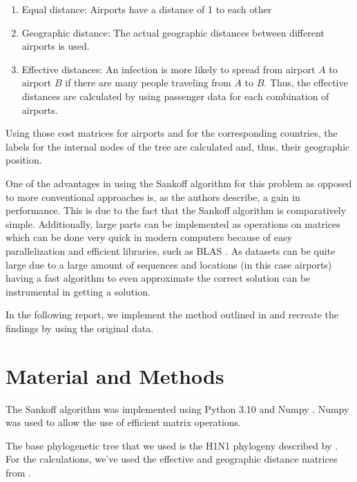 \documentclass{article}
\begin{document}
\begin{enumerate}
  \item Equal distance: Airports have a distance of 1 to each other
  \item Geographic distance: The actual geographic distances between different
  airports is used.
  \item Effective distances: An infection is more likely to spread from
  airport $A$ to airport $B$ if there are many people traveling from $A$ to
  $B$. Thus, the effective distances are calculated by using passenger data
  for each combination of airports.
\end{enumerate}

Using those cost matrices for airports and for the corresponding countries, the
labels for the internal nodes of the tree are calculated and, thus, their
geographic position.

One of the advantages in using the Sankoff algorithm for this problem as opposed to more
conventional approaches is, as the authors describe, a gain in performance. This is due to the fact
that the Sankoff algorithm is comparatively simple. Additionally, large parts can be implemented as
operations on matrices which can be done very quick in modern computers because of easy
parallelization and efficient libraries, such as BLAS \cite{lawsonBasicLinearAlgebra1979}. As
datasets can be quite large due to a large
amount of sequences and locations (in this case airports) having a fast
algorithm to even approximate the correct solution can be instrumental in getting a solution.

In the following report, we implement the method outlined in
\cite{reimeringPhylogeographicReconstructionUsing2020} and recreate the findings
by using the original data.

\section{Material and Methods}
The Sankoff algorithm was implemented using Python 3.10
\cite{pythonsoftwarefoundationWelcomePythonOrg2023} and Numpy \cite{harrisArrayProgrammingNumPy2020}. Numpy was used to allow the use of
efficient matrix operations.

The base phylogenetic tree that we used is the H1N1 phylogeny described by
\cite{reimeringPhylogeographicReconstructionUsing2020}. For the calculations,
we've used the effective and geographic distance matrices from
\cite{reimeringDistanceMatricesParsimonious2019}. 
\end{document}
